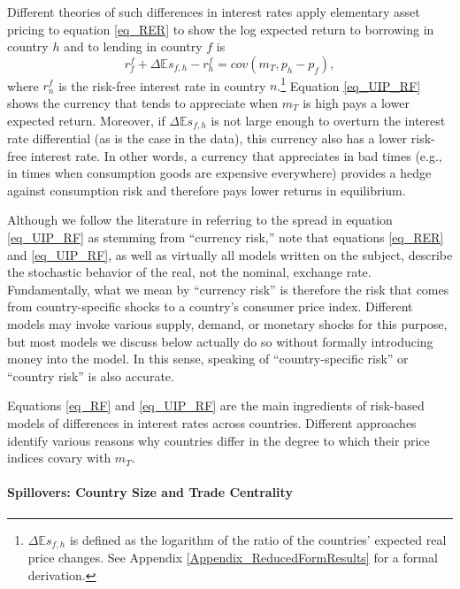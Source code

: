 \documentclass[11pt]{article}
\begin{document}
Different theories of such differences in interest rates apply elementary asset pricing to equation \ref{eq_RER} to show the log expected return to borrowing in country $h$ and to lending in country $f$ is
\begin{equation}
  r^f_f + \Delta \mathbb{E} s_{f,h} - r^f_h 
  = cov \left( m_{T}, p_h - p_f\right),
  \label{eq_UIP_RF}
\end{equation}%
where $r^f_n$ is the risk-free interest rate in country $n$.\footnote{$\Delta \mathbb{E} s_{f,h}$ is defined as the logarithm of the ratio of the countries' expected real price changes. See Appendix \ref{Appendix_ReducedFormResults} for a formal derivation.} Equation \ref{eq_UIP_RF} shows the currency that tends to appreciate when $m_T$ is high pays a lower expected return. Moreover, if $\Delta \mathbb{E} s_{f,h}$ is not large enough to overturn the interest rate differential (as is the case in the data), this currency also has a lower risk-free interest rate. In other words, a currency that appreciates in bad times (e.g., in times when consumption goods are expensive everywhere) provides a hedge against consumption risk and therefore pays lower returns in equilibrium.

\begin{tcolorbox}[sharp corners, title = Currency vs.~Country Risk]
Although we follow the literature in referring to the spread in equation \ref{eq_UIP_RF} as stemming from ``currency risk,'' note that equations \ref{eq_RER} and \ref{eq_UIP_RF}, as well as virtually all models written on the subject, describe the stochastic behavior of the real, not the nominal, exchange rate. Fundamentally, what we mean by ``currency risk'' is therefore the risk that comes from country-specific shocks to a country's consumer price index. Different models may invoke various supply, demand, or monetary shocks for this purpose, but most models we discuss below actually do so without formally introducing money into the model. In this sense, speaking of ``country-specific risk'' or ``country risk'' is also accurate. 
\end{tcolorbox}

Equations \ref{eq_RF} and \ref{eq_UIP_RF} are the main ingredients of risk-based models of differences in interest rates across countries. Different approaches identify various reasons why countries differ in the degree to which their price indices covary with $m_T$.

\paragraph*{Spillovers: Country Size and Trade Centrality}
\end{document}
